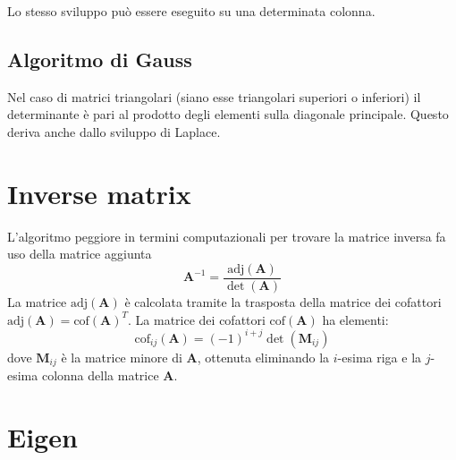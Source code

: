 \documentclass[10pt]{article}
\begin{document}
Lo stesso sviluppo può essere eseguito su una determinata colonna.

\subsection{Algoritmo di Gauss}

Nel caso di matrici triangolari (siano esse triangolari superiori o inferiori) il determinante è pari al prodotto degli elementi sulla diagonale principale. Questo deriva anche dallo sviluppo di Laplace.




\section{Inverse matrix}

L'algoritmo peggiore in termini computazionali per trovare la matrice inversa fa uso della matrice aggiunta
\begin{equation}
\mathbf{A}^{-1} = \frac{\text{adj}(\mathbf{A})}{\det(\mathbf{A})}
\end{equation}
La matrice $\text{adj}(\mathbf{A})$ è calcolata tramite la trasposta della matrice dei cofattori $\text{adj}(\mathbf{A}) = \text{cof}(\mathbf{A})^T$. La matrice dei cofattori $\text{cof}(\mathbf{A})$ ha elementi:
\begin{equation}
\text{cof}_{ij}(\mathbf{A}) = (-1)^{i+j} \det\left(\mathbf{M}_{ij}\right)
\end{equation}
dove $\mathbf{M}_{ij}$ è la matrice minore di $\mathbf{A}$, ottenuta eliminando la $i$-esima riga e la $j$-esima colonna della matrice $\mathbf{A}$.




\section{Eigen}
\end{document}
